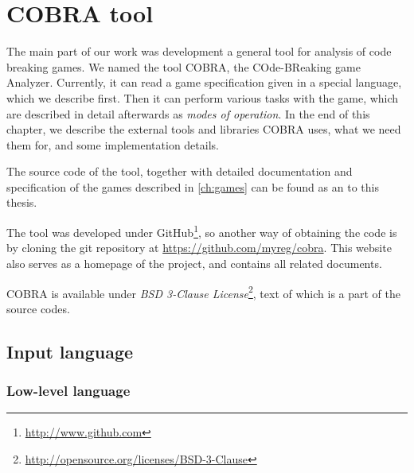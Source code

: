 \chapter{COBRA tool}
\label{ch:cobra}
The main part of our work was development a general tool for analysis of
  code breaking games.
We named the tool COBRA, the COde-BReaking game Analyzer.
Currently, it can read a game specification given in a special language, which
  we describe first.
Then it can perform various tasks with the game, which are described in detail
  afterwards as \emph{modes of operation}.
In the end of this chapter, we describe the external tools and libraries COBRA uses,
  what we need them for, and some implementation details.

The source code of the tool, together with detailed documentation
  and specification of the games described in \autoref{ch:games}
  can be found as an  to this thesis.

The tool was developed under GitHub\footnote{\url{http://www.github.com}},
  so another way of obtaining the code is by cloning
  the git repository at \url{https://github.com/myreg/cobra}.
This website also serves as a homepage of the project, and contains
  all related documents.

COBRA is available under \emph{BSD 3-Clause License}\footnote{\url{http://opensource.org/licenses/BSD-3-Clause}},
  text of which is a part of the source codes.

\section{Input language}


\subsection{Low-level language}

